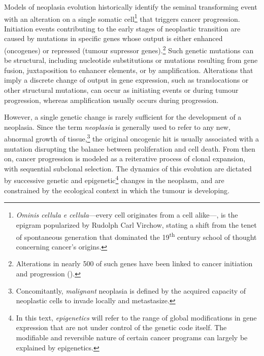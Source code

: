 Models of neoplasia evolution historically identify the seminal transforming
event with an alteration on a single somatic cell\footnote{\emph{Ominis cellula
    e cellula}---every cell originates from a cell alike---, is the epigram
  popularized by Rudolph Carl Virchow, stating a shift from the tenet of
  spontaneous generation that dominated the 19\textsuperscript{th} century
  school of thought concerning cancer's origins.} that triggers cancer
progression.  Initiation events contributing to the early stages of neoplastic
transition are caused by mutations in specific genes whose output is either
enhanced (oncogenes) or repressed (tumour supressor genes).\footnote{Alterations
  in nearly 500 of such genes have been linked to cancer initiation and
  progression (\citealp{forbes_catalogue_2008}).}  Such genetic mutations can be
structural, including nucleotide substitutions or mutations resulting from gene
fusion,\cite{konopka_cell_1985} juxtaposition to enhancer
elements,\cite{tsujimoto_t14;18_1985} or by amplification.  Alterations that
imply a discrete change of output in gene expression, such as translocations or
other structural mutations, can occur as initiating
events\cite{finger_common_1986} or during tumour progression, whereas
amplification usually occurs during progression.\cite{croce_oncogenes_2008}

However, a single genetic change is rarely sufficient for the development of a
neoplasia.  Since the term \emph{neoplasia} is generally used to refer to any
new, abnormal growth of tissue,\footnote{Concomitantly, \emph{malignant}
  neoplasia is defined by the acquired capacity of neoplastic cells to invade
  locally and metastasize.} the original oncogenic hit is usually associated
with a mutation disrupting the balance between proliferation and cell death.
From then on, cancer progression is modeled as a reiterative process of clonal
expansion, with sequential subclonal
selection.\cite{nowell_clonal_1976,greaves_clonal_2012} The dynamics of this
evolution are dictated by successive genetic and epigenetic\footnote{In this
  text, \emph{epigenetics} will refer to the range of global modifications in
  gene expression that are not under control of the genetic code itself.  The
  modifiable and reversible nature of certain cancer programs can largely be
  explained by epigenetics.} changes in the neoplasm, and are constrained by the
ecological context in which the tumour is developing.

